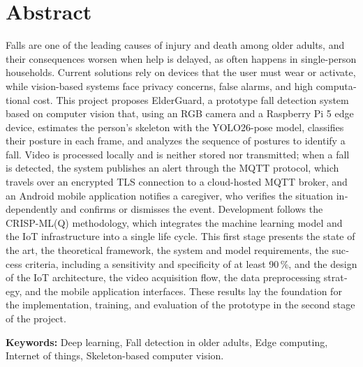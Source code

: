 \documentclass[12pt,a4paper,oneside]{book}
\theoremstyle{plain}
\theoremstyle{definition}
\theoremstyle{remark}
\begin{document}
\chapter*{Abstract}
 
\begin{otherlanguage}{english}
Falls are one of the leading causes of injury and death among older adults, and their consequences worsen when help is delayed, as often happens in single-person households. Current solutions rely on devices that the user must wear or activate, while vision-based systems face privacy concerns, false alarms, and high computational cost. This project proposes ElderGuard, a prototype fall detection system based on computer vision that, using an RGB camera and a Raspberry Pi 5 edge device, estimates the person's skeleton with the YOLO26-pose model, classifies their posture in each frame, and analyzes the sequence of postures to identify a fall. Video is processed locally and is neither stored nor transmitted; when a fall is detected, the system publishes an alert through the MQTT protocol, which travels over an encrypted TLS connection to a cloud-hosted MQTT broker, and an Android mobile application notifies a caregiver, who verifies the situation independently and confirms or dismisses the event. Development follows the CRISP-ML(Q) methodology, which integrates the machine learning model and the IoT infrastructure into a single life cycle. This first stage presents the state of the art, the theoretical framework, the system and model requirements, the success criteria, including a sensitivity and specificity of at least 90\,\%, and the design of the IoT architecture, the video acquisition flow, the data preprocessing strategy, and the mobile application interfaces. These results lay the foundation for the implementation, training, and evaluation of the prototype in the second stage of the project.


\vspace{1em}
\noindent\textbf{Keywords:} Deep learning, Fall detection in older adults, Edge computing, Internet of things, Skeleton-based computer vision.
\end{otherlanguage}

\cleardoublepage
\tableofcontents
\cleardoublepage
\listoffigures
{}
\cleardoublepage
\listoftables
{}

\mainmatter
\pagestyle{fancy}
\end{document}

